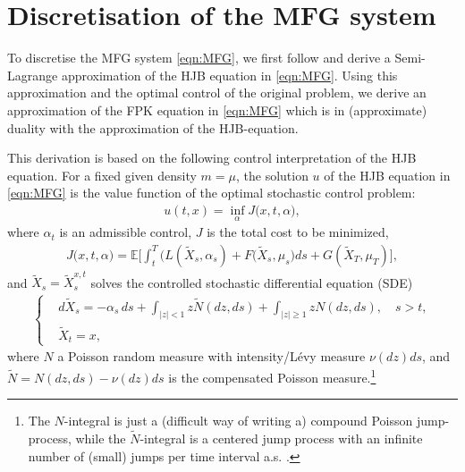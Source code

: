 \documentclass[a4paper,  twoside, 10pt, leqno]{amsart}
\theoremstyle{remark}
\theoremstyle{definition}
\begin{document}
\section{Discretisation of the MFG system} \label{sec:discretization}



To discretise the MFG system \eqref{eqn:MFG}, we first follow \cite{camilli2009finite} and derive a Semi-Lagrange
approximation of the HJB equation in \eqref{eqn:MFG}. Using this
approximation and the 
optimal control of the original problem, we derive an approximation
of the FPK equation in \eqref{eqn:MFG} which is in (approximate) duality with the approximation of the HJB-equation. 

This derivation is based on the following control interpretation of the HJB equation.
For a fixed given density $m= \mu$, the solution $u$ of the
HJB equation in \eqref{eqn:MFG} is the value function of the
optimal stochastic control problem: 
\begin{align}\label{eq:value-fun}
    u (t,x) = \inf_{\alpha} J \big( x,t, \alpha \big),
\end{align}
where $\alpha_t$ is an admissible control, $J$ is the total cost to be minimized,
\begin{align}
    J \big( x,t, \alpha \big) = \mathbb{E} \bigg[ \int_t^T  \Big( L (\tilde X_s, \alpha_s ) + F (\tilde X_s, \mu_s \Big) ds + G (\tilde X_T, \mu_T)\bigg],
    \label{cost_fun}
\end{align}
and $\tilde X_s=\tilde X_s^{x,t}$ solves the controlled stochastic differential
equation (SDE)
\begin{align}
    \begin{cases}
    &d\tilde X_s =  -\alpha_s\, ds + \int_{|z| <1} z \tilde{N} (dz,ds) +
      \int_{|z| \geq 1} z N (dz,ds), \quad s>t,\\
    &\tilde X_t = x,
    \end{cases}
    \label{SDE}
\end{align}
where
$N$ a Poisson random measure with
intensity/L\'evy measure $\nu (dz) ds$, and $\tilde{N} = N (dz,ds) - \nu
(dz) ds$ is the compensated Poisson measure.\footnote{The $N$-integral is just
a (difficult way of writing a)
compound Poisson jump-process, while the $\tilde N$-integral
is a centered jump process with an infinite number of (small) jumps per time
interval a.s. \cite{applebaum2009levy}.}
\end{document}
